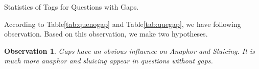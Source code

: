 \documentclass[bsc,frontabs,twoside,singlespacing,parskip,deptreport]{infthesis}     %
\newtheorem{observation}{Observation}[chapter]
\begin{document}
\begin{minipage}{\textwidth}
\begin{minipage}[t]{0.45\textwidth}
        \end{minipage}
        \begin{minipage}[t]{0.45\textwidth}
        \centering
        \makeatletter{}\makeatother



\caption{Statistics of Tags for Questions with Gaps.}
\label{tab:quegap}


        \end{minipage}
    \end{minipage}


According to Table\ref{tab:quenogap} and Table\ref{tab:quegap}, we have following observation. Based on this observation, we make two hypotheses. 

\begin{observation}
Gaps have an obvious influence on Anaphor and Sluicing. It is much more anaphor and sluicing appear in questions without gaps.
\end{observation}
\end{document}
